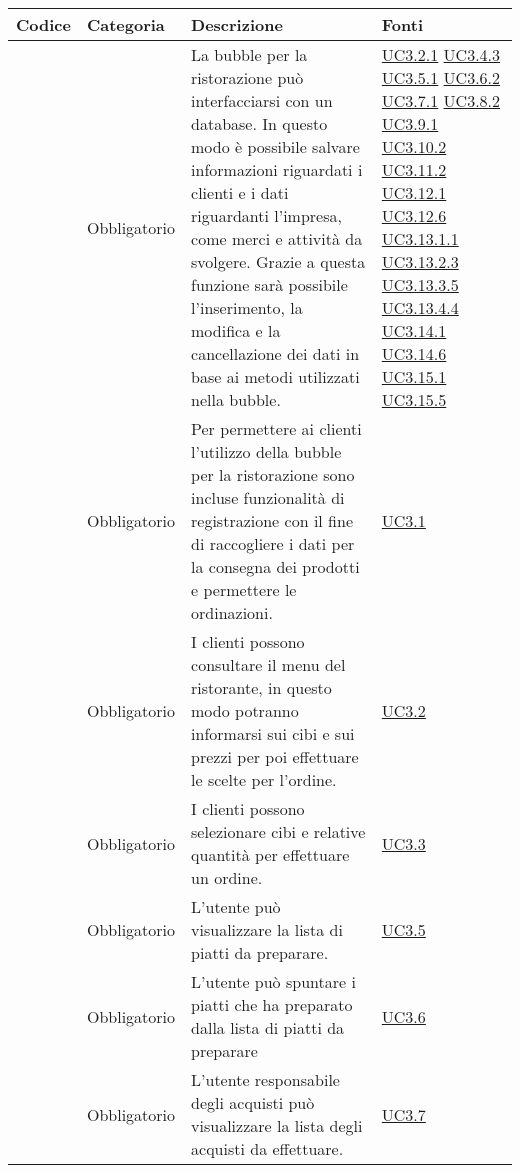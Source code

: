 \begin{longtable}{|P{1.5cm}|P{3cm}|P{6cm}|P{2.5cm}|}
	\hline \textbf{Codice} & \textbf{Categoria} & \textbf{Descrizione} & \textbf{Fonti} \\
	\hline \RequisitoObF\label{L21} & Obbligatorio & La bubble per la ristorazione può interfacciarsi con un database. In questo modo è possibile salvare informazioni riguardati i clienti e i dati riguardanti l’impresa, come merci e attività da svolgere. Grazie a questa funzione sarà possibile l’inserimento, la modifica e la cancellazione dei dati in base ai metodi utilizzati nella bubble. & \hyperref[UC3.2.1]{UC3.2.1} \hyperref[UC3.4.3]{UC3.4.3} \hyperref[UC3.5.1]{UC3.5.1} \hyperref[UC3.6.2]{UC3.6.2} \hyperref[UC3.7.1]{UC3.7.1} \hyperref[UC3.8.2]{UC3.8.2} \hyperref[UC3.9.1]{UC3.9.1} \hyperref[UC3.10.2]{UC3.10.2} \hyperref[UC3.11.2]{UC3.11.2} \hyperref[UC3.12.1]{UC3.12.1} \hyperref[UC3.12.6]{UC3.12.6} \hyperref[UC3.13.1.1]{UC3.13.1.1} \hyperref[UC3.13.2.3]{UC3.13.2.3} \hyperref[UC3.13.3.5]{UC3.13.3.5} \hyperref[UC3.13.4.4]{UC3.13.4.4} \hyperref[UC3.14.1]{UC3.14.1} \hyperref[UC3.14.6]{UC3.14.6} \hyperref[UC3.15.1]{UC3.15.1} \hyperref[UC3.15.5]{UC3.15.5} \\
	\hline \RequisitoObF\label{L22} & Obbligatorio & Per permettere ai clienti l’utilizzo della bubble per la ristorazione sono incluse funzionalità di registrazione con il fine di raccogliere i dati per la consegna dei prodotti e permettere le ordinazioni. & \hyperref[UC3.1]{UC3.1} \\
	\hline \RequisitoObF\label{L23} & Obbligatorio & I clienti possono consultare il menu del ristorante, in questo modo potranno informarsi sui cibi e sui prezzi per poi effettuare le scelte per l’ordine. & \hyperref[UC3.2]{UC3.2} \\
	\hline \RequisitoObF\label{L24} & Obbligatorio & I clienti possono selezionare cibi e relative quantità per effettuare un ordine. & \hyperref[UC3.3]{UC3.3} \\
	\hline \RequisitoObF\label{L25} & Obbligatorio & L’utente  può visualizzare la lista di piatti da preparare. & \hyperref[UC3.5]{UC3.5} \\
	\hline \RequisitoObF\label{L26} & Obbligatorio & L’utente  può spuntare i piatti che ha preparato dalla lista di piatti da preparare  & \hyperref[UC3.6]{UC3.6} \\
	\hline \RequisitoObF\label{L27} & Obbligatorio & L’utente responsabile degli acquisti può visualizzare la lista degli acquisti da effettuare. & \hyperref[UC3.7]{UC3.7} \\

\end{longtable}
